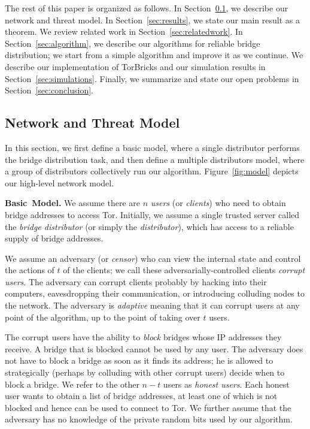 \documentclass[a4paper,UKenglish]{lipics-v2016}
\newcommand{\fullpaper}[1]{#1}
\newcommand{\fullpaper}[1]{}
\newcommand{\bricks}{}
\def\bricks/{\mbox{TorBricks}}
\newcommand{\sfsize}{\fontsize{0.68\baselineskip}{0.68\baselineskip}\selectfont}
\newcommand{\sans}[1]{\textbf{\textsf{\sfsize \mbox{#1}}}}
\newcommand{\para}[1]{\vspace{0.55em} \noindent \sans{{\mbox{#1}}}}
\begin{document}
The rest of this paper is organized as follows. In Section~\ref{sec:model}, we describe our network and threat model. In Section~\ref{sec:results}, we state our main result as a theorem. We review related work in Section~\ref{sec:relatedwork}. In Section~\ref{sec:algorithm}, we describe our algorithms for reliable bridge distribution; we start from a simple algorithm and improve it as we continue. We describe our implementation of \bricks/ and our simulation results in Section~\ref{sec:simulations}. Finally, we summarize and state our open problems in Section~\ref{sec:conclusion}.

\subsection{Network and Threat Model} \label{sec:model}

In this section, we first define a basic model, where a single distributor performs the bridge distribution task, and then define a multiple distributors model, where a group of distributors collectively run our algorithm. Figure~\ref{fig:model} depicts our high-level network model.

\para{Basic Model.}
We assume there are $n$ \emph{users} (or \emph{clients}) who need to obtain bridge addresses to access Tor. Initially, we assume a single trusted server called the \emph{bridge distributor} (or simply the \emph{distributor}), which has access to a reliable supply of bridge addresses.%

We assume an adversary (or \emph{censor}) who can view the internal state and control the actions of $t$ of the clients; we call these adversarially-controlled clients \emph{corrupt users}. \fullpaper{The adversary can corrupt clients probably by hacking into their computers, eavesdropping their communication, or introducing colluding nodes to the network.}
The adversary is \emph{adaptive} meaning that it can corrupt users at any point of the algorithm, up to the point of taking over $t$ users.

The corrupt users have the ability to \emph{block} bridges whose IP addresses they receive. A bridge that is blocked cannot be used by any user.
The adversary does not have to block a bridge as soon as it finds its address; he is allowed to strategically (perhaps by colluding with other corrupt users) decide when to block a bridge. 
We refer to the other ${n-t}$ users as \emph{honest users}. Each honest user wants to obtain a list of bridge addresses, at least one of which is not blocked and hence can be used to connect to Tor. 
We further assume that the adversary has no knowledge of the private random bits used by our algorithm.
\end{document}
